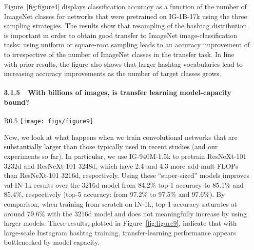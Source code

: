 \documentclass[runningheads]{llncs}
\begin{document}
Figure~\ref{fig:figure4} displays classification accuracy as a function of the number of ImageNet classes for networks that were pretrained on IG-1B-17k using the three sampling strategies. The results show that resampling of the hashtag distribution is important in order to obtain good transfer to ImageNet image-classification tasks: using uniform or square-root sampling leads to an accuracy improvement of  to  irrespective of the number of ImageNet classes in the transfer task. In line with prior results, the figure also shows that larger hashtag vocabularies lead to increasing accuracy improvements as the number of target classes grows.

\paragraph{3.1.5~~With billions of images, is transfer learning model-capacity bound?}
\begin{wrapfigure}[17]{R}{0.5\textwidth}
  \centering
  \vspace{-20pt}
  \texttt{[image: figs/figure9]}
  \caption{\small Classification accuracy on val-IN-1k using ResNeXt-101 32\{4, 8 16, 32, 48\}d with and without pretraining on the IG-940M-1.5k dataset.}
  \vspace{-5pt}
  \label{fig:figure9}
\end{wrapfigure}
Now, we look at what happens when we train convolutional networks that are substantially larger than those typically used in recent studies (and our experiments so far). In particular, we use IG-940M-1.5k to pretrain ResNeXt-101 3232d and ResNeXt-101 3248d, which have 2.4 and 4.3 more add-mult FLOPs than ResNeXt-101 3216d, respectively. Using these ``super-sized'' models improves val-IN-1k results over the 3216d model from 84.2\% top-1 accuracy to 85.1\% and 85.4\%, respectively (top-5 accuracy: from 97.2\% to 97.5\% and 97.6\%). By comparison, when training from scratch on IN-1k, top-1 accuracy saturates at around 79.6\% with the 3216d model and does not meaningfully increase by using larger models. These results, plotted in Figure~\ref{fig:figure9}, indicate that with large-scale Instagram hashtag training, transfer-learning performance appears bottlenecked by model capacity.
\end{document}
